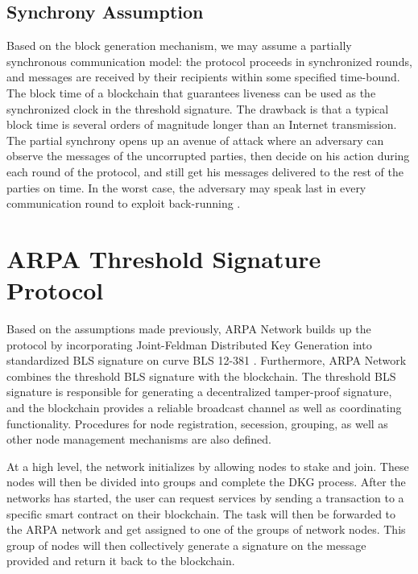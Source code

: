 \documentclass[11pt]{article}
\begin{document}
\subsection{Synchrony Assumption}

Based on the block generation mechanism, we may assume a partially synchronous communication model: the protocol proceeds in synchronized rounds, and messages are received by their recipients within some specified time-bound. The block time of a blockchain that guarantees liveness can be used as the synchronized clock in the threshold signature. The drawback is that a typical block time is several orders of magnitude longer than an Internet transmission. The partial synchrony opens up an avenue of attack where an adversary can observe the messages of the uncorrupted parties, then decide on his action during each round of the protocol, and still get his messages delivered to the rest of the parties on time. In the worst case, the adversary may speak last in every communication round to exploit back-running \cite{gennaro2007secure}.

\section{ARPA Threshold Signature Protocol}

Based on the assumptions made previously, ARPA Network builds up the protocol by incorporating Joint-Feldman Distributed Key Generation into standardized BLS signature \cite{irtf-cfrg-bls-signature-05} on curve BLS 12-381 \cite{sean2017bls}. Furthermore, ARPA Network combines the threshold BLS signature with the blockchain. The threshold BLS signature is responsible for generating a decentralized tamper-proof signature, and the blockchain provides a reliable broadcast channel as well as coordinating functionality. Procedures for node registration, secession, grouping, as well as other node management mechanisms are also defined.

At a high level, the network initializes by allowing nodes to stake and join. These nodes will then be divided into groups and complete the DKG process. After the networks has started, the user can request services by sending a transaction to a specific smart contract on their blockchain. The task will then be forwarded to the ARPA network and get assigned to one of the groups of network nodes. This group of nodes will then collectively generate a signature on the message provided and return it back to the blockchain.
\end{document}
